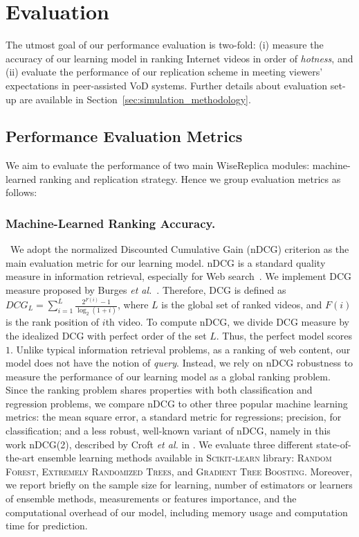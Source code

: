 \section{Evaluation}
\label{sec:evaluation}

The utmost goal of our performance evaluation is two-fold: (i) measure the accuracy of our learning model in ranking Internet videos in order of \emph{hotness}, and (ii) evaluate the performance of our replication scheme in meeting viewers' expectations in peer-assisted VoD systems. Further details about evaluation set-up are available in Section~\ref{sec:simulation_methodology}.

\subsection{Performance Evaluation Metrics}
\label{subsec:methodology_metrics}

We aim to evaluate the performance of two main WiseReplica modules: machine-learned ranking and replication strategy. Hence we group evaluation metrics as follows:

\subsubsection{Machine-Learned Ranking Accuracy.} 

\ We adopt the normalized Discounted Cumulative Gain (nDCG) criterion as the main evaluation metric for our learning model. nDCG is a standard quality measure in information retrieval, especially for Web search~\cite{jarvelin2002cumulated,manning2008introduction}. We implement DCG measure proposed by Burges \emph{et al.}~\cite{burges2005learning}. Therefore, DCG is defined as $DCG_{L}=\sum_{i=1}^L \frac{2^{F(i)}-1}{\log_{2}(1+i)}$, where $L$ is the global set of ranked videos, and $F(i)$ is the rank position of $i$th video. To compute nDCG, we divide DCG measure by the idealized DCG with perfect order of the set $L$. Thus, the perfect model scores $1$. Unlike typical information retrieval problems, as a ranking of web content, our model does not have the notion of \emph{query}. Instead, we rely on nDCG robustness to measure the performance of our learning model as a global ranking problem. Since the ranking problem shares properties with both classification and regression problems, we compare nDCG to other three popular machine learning metrics: the mean square error, a standard metric for regressions; precision, for classification; and a less robust, well-known variant of nDCG, namely  in this work nDCG(2), described by Croft \emph{et al.} in \cite{croft2010search}. We evaluate three different state-of-the-art ensemble learning methods available in \textsc{Scikit-learn} library: \textsc{Random Forest}, \textsc{Extremely Randomized Trees}, and \textsc{Gradient Tree Boosting}. Moreover, we report briefly on the sample size for learning, number of estimators or learners of ensemble methods, measurements or features importance, and the computational overhead of our model, including memory usage and computation time for prediction.

